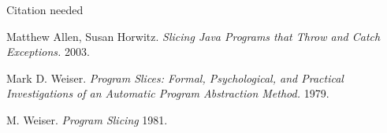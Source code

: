 \begin{thebibliography}{99}
	Citation needed

	Matthew Allen, Susan Horwitz.
	\textsl{Slicing Java Programs that Throw and Catch Exceptions.}
	2003.
	
	Mark D. Weiser.
	\textsl{Program Slices: Formal, Psychological, and Practical Investigations of an Automatic Program Abstraction Method.}
	1979.
	
	M. Weiser.
	\textsl{Program Slicing}
	1981.

\end{thebibliography}